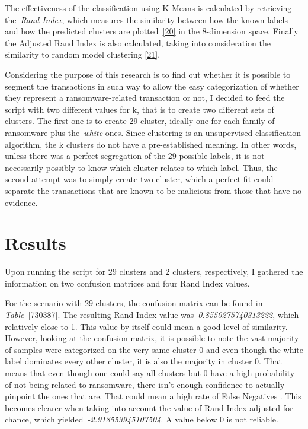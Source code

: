 \documentclass[10pt]{article}
\begin{document}
{\label{153660}}

The effectiveness of the classification using K-Means is calculated by
retrieving the~\emph{Rand Index}, which measures the similarity between
how the known labels and how the predicted clusters are
plotted~\hyperref[csl:20]{[20]} in the 8-dimension space. Finally the
Adjusted Rand Index is also calculated, taking into consideration the
similarity to random model clustering \hyperref[csl:21]{[21]}.

Considering the purpose of this research is to find out whether it is
possible to segment the transactions in such way to allow the easy
categorization of whether they represent a ransomware-related
transaction or not, I decided to feed the script with two different
values for k, that is to create two different sets of clusters. The
first one is to create 29 cluster, ideally one for each family of
ransomware plus the~\emph{white} ones. Since clustering is an
unsupervised classification algorithm, the k clusters do not have a
pre-established meaning. In other words, unless there was a perfect
segregation of the 29 possible labels, it is not necessarily possibly to
know which cluster relates to which label. Thus, the second attempt was
to simply create two cluster, which a perfect fit could separate the
transactions that are known to be malicious from those that have no
evidence.

\section*{Results}

{\label{481498}}

Upon running the script for 29 clusters and 2 clusters, respectively, I
gathered the information on two confusion matrices and four Rand Index
values.

For the scenario with 29 clusters, the confusion matrix can be found in
\emph{Table~}{\ref{730387}}. The resulting Rand Index
value was~\emph{0.8550275740313222}, which relatively close to 1. This
value by itself could mean a good level of similarity. However, looking
at the confusion matrix, it is possible to note the vast majority of
samples were categorized on the very same cluster 0 and even though the
white label dominates every other cluster, it is also the majority in
cluster 0. That means that even though one could say all clusters but 0
have a high probability of not being related to ransomware, there isn't
enough confidence to actually pinpoint the ones that are. That could
mean a high rate of False Negatives . This becomes clearer when taking
into account the value of Rand Index adjusted for chance, which
yielded~\emph{-2.918553945107504}. A value below 0 is not reliable.
\end{document}
